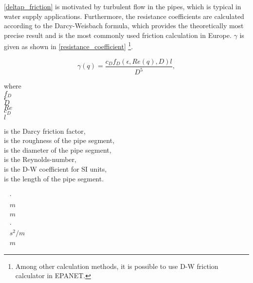 \eqref{deltap_friction} is motivated by turbulent flow in the pipes, which is typical in water supply applications. Furthermore, the resistance coefficients are calculated according to the Darcy-Weisbach formula, which provides the theoretically most precise result and is the most commonly used friction calculation in Europe\cite{prahata,agency2016epanet}. $\gamma$ is given as shown in \eqref{resistance_coefficient} \footnote{ Among other calculation methods, it is possible to use D-W friction calculator in EPANET. }.  

\begin{equation}
  \label{resistance_coefficient}
  \gamma(q) = \frac{c_D f_{D}(\epsilon,Re(q), D )l}{D^{5}},
\end{equation}

 \begin{minipage}[t]{0.20\textwidth}
where\\
\hspace*{8mm} $f_{D}$ \\
\hspace*{8mm} $\epsilon$ \\
\hspace*{8mm} $D$ \\
\hspace*{8mm} $Re$ \\
\hspace*{8mm} $c_D$ \\
\hspace*{8mm} $l$ 
\end{minipage}
\begin{minipage}[t]{0.68\textwidth}
\vspace*{2mm}
is the Darcy friction factor,  \\
is the roughness of the pipe segment,  \\
is the diameter of the pipe segment,  \\
is the Reynolds-number,  \\
is the D-W  coefficient for SI units,  \\
is the length of the pipe segment.
\end{minipage}
\begin{minipage}[t]{0.10\textwidth}
\vspace*{2mm}
\textcolor{White}{te}$\unit{\cdot}$\\
\textcolor{White}{te}$\unit{m}$\\
\textcolor{White}{te}$\unit{m}$ \\
\textcolor{White}{te}$\unit{\cdot}$ \\
\textcolor{White}{te}$\unit{s^2/m}$ \\
\textcolor{White}{te}$\unit{m}$
\end{minipage}

